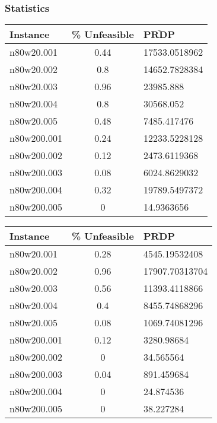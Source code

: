 \subsubsection{Statistics}

\begin{center}
\begin{tabular}{|l|c|l|}
\hline
\textbf{Instance} & \textbf{\% Unfeasible} & $\mathbf{\bar{PRDP}}$\\
\hline
n80w20.001 &	0.44 &	17533.0518962\\
\hline
n80w20.002 &	0.8 &	14652.7828384\\
\hline
n80w20.003 &	0.96 &	23985.888\\
\hline
n80w20.004 &	0.8 &	30568.052\\
\hline
n80w20.005 &	0.48 &	7485.417476\\
\hline
n80w200.001 &	0.24 &	12233.5228128\\
\hline
n80w200.002 &	0.12 &	2473.6119368\\
\hline
n80w200.003 &	0.08 &	6024.8629032\\
\hline
n80w200.004 &	0.32 &	19789.5497372\\
\hline
n80w200.005 &	0 &	14.9363656\\
\hline
\end{tabular}
\label{tab:acostat}
\end{center}

\begin{center}
\begin{tabular}{|l|c|l|}
\hline
\textbf{Instance} & \textbf{\% Unfeasible} & $\mathbf{\bar{PRDP}}$\\
\hline
n80w20.001 &	0.28 & 4545.19532408\\
\hline
n80w20.002 &	0.96 &	17907.70313704\\
\hline
n80w20.003 &	0.56 &	11393.4118866\\
\hline
n80w20.004 &	0.4 &	8455.74868296\\
\hline
n80w20.005 &	0.08 &	1069.74081296\\
\hline
n80w200.001 &	0.12 &	3280.98684\\
\hline
n80w200.002 &	0 &	34.565564\\
\hline
n80w200.003 &	0.04 &	891.459684\\
\hline
n80w200.004 &	0 &	24.874536\\
\hline
n80w200.005 &	0 &	38.227284\\
\hline
\end{tabular}
\label{tab:sastat}
\end{center}


